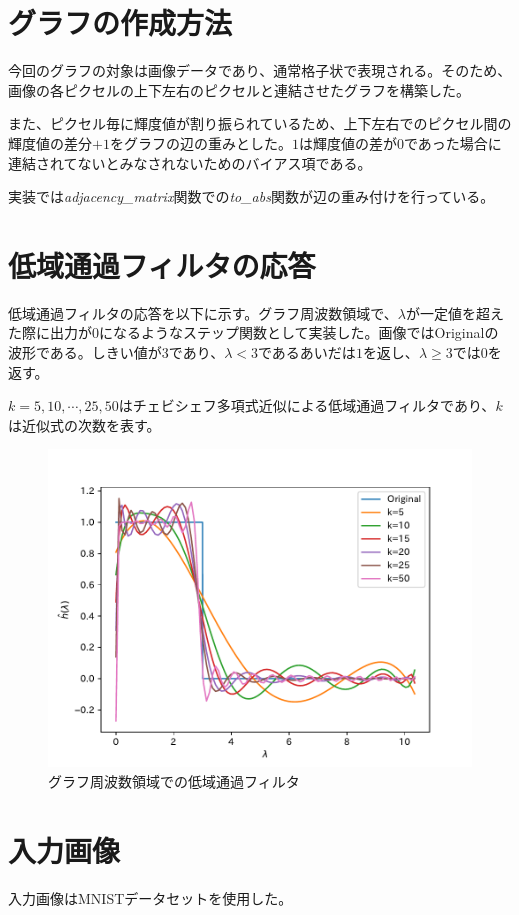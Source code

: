 \section{グラフの作成方法}
今回のグラフの対象は画像データであり、通常格子状で表現される。そのため、画像の各ピクセルの上下左右のピクセルと連結させたグラフを構築した。

また、ピクセル毎に輝度値が割り振られているため、上下左右でのピクセル間の輝度値の差分$+1$をグラフの辺の重みとした。$1$は輝度値の差が$0$であった場合に連結されてないとみなされないためのバイアス項である。

実装では{\it adjacency\_matrix}関数での{\it to\_abs}関数が辺の重み付けを行っている。


\section{低域通過フィルタの応答}\label{sec:filter}
低域通過フィルタの応答を以下に示す。グラフ周波数領域で、$\lambda$が一定値を超えた際に出力が$0$になるようなステップ関数として実装した。画像では{Original}の波形である。しきい値が3であり、$\lambda < 3$であるあいだは$1$を返し、$\lambda\geq3$では0を返す。

$k=5, 10,\cdots, 25, 50$はチェビシェフ多項式近似による低域通過フィルタであり、$k$は近似式の次数を表す。
\begin{figure}[h]
  \centering
  \includegraphics[width=0.95\linewidth]{fig/filter_response.pdf}
  \caption{グラフ周波数領域での低域通過フィルタ}
  \label{fig:filter_res}
\end{figure}

\newpage
\section{入力画像}
入力画像はMNISTデータセットを使用した。

